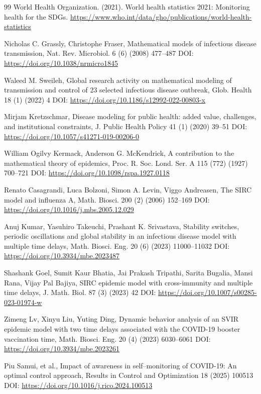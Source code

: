 \documentclass[10pt]{NSP1}
\begin{document}
\begin{thebibliography}{99}
World Health Organization. (2021). World health statistics 2021: Monitoring health for the SDGs. \url{https://www.who.int/data/gho/publications/world-health-statistics}

Nicholas C. Grassly, Christophe Fraser, Mathematical models of infectious disease transmission, Nat. Rev. Microbiol. 6 (6) (2008) 477--487 DOI: \url{https://doi.org/10.1038/nrmicro1845}

Waleed M. Sweileh, Global research activity on mathematical modeling of transmission and control of 23 selected infectious disease outbreak, Glob. Health 18 (1) (2022) 4 DOI: \url{https://doi.org/10.1186/s12992-022-00803-x}

Mirjam Kretzschmar, Disease modeling for public health: added value, challenges, and institutional constraints, J. Public Health Policy 41 (1) (2020) 39--51 DOI: \url{https://doi.org/10.1057/s41271-019-00206-0}

William Ogilvy Kermack, Anderson G. McKendrick, A contribution to the mathematical theory of epidemics, Proc. R. Soc. Lond. Ser. A 115 (772) (1927) 700--721 DOI: \url{https://doi.org/10.1098/rspa.1927.0118}

Renato Casagrandi, Luca Bolzoni, Simon A. Levin, Viggo Andreasen, The SIRC model and influenza A, Math. Biosci. 200 (2) (2006) 152--169 DOI: \url{https://doi.org/10.1016/j.mbs.2005.12.029}

Anuj Kumar, Yasuhiro Takeuchi, Prashant K. Srivastava, Stability switches, periodic oscillations and global stability in an infectious disease model with multiple time delays, Math. Biosci. Eng. 20 (6) (2023) 11000--11032 DOI: \url{https://doi.org/10.3934/mbe.2023487}

Shashank Goel, Sumit Kaur Bhatia, Jai Prakash Tripathi, Sarita Bugalia, Mansi Rana, Vijay Pal Bajiya, SIRC epidemic model with cross-immunity and multiple time delays, J. Math. Biol. 87 (3) (2023) 42 DOI: \url{https://doi.org/10.1007/s00285-023-01974-w}

Zimeng Lv, Xinyu Liu, Yuting Ding, Dynamic behavior analysis of an SVIR epidemic model with two time delays associated with the COVID-19 booster vaccination time, Math. Biosci. Eng. 20 (4) (2023) 6030--6061 DOI: \url{https://doi.org/10.3934/mbe.2023261}

Piu Samui, et al., Impact of awareness in self--monitoring of COVID-19: An optimal control approach, Results in Control and Optimization 18 (2025) 100513 DOI: \url{https://doi.org/10.1016/j.rico.2024.100513}


\end{thebibliography}
\end{document}
